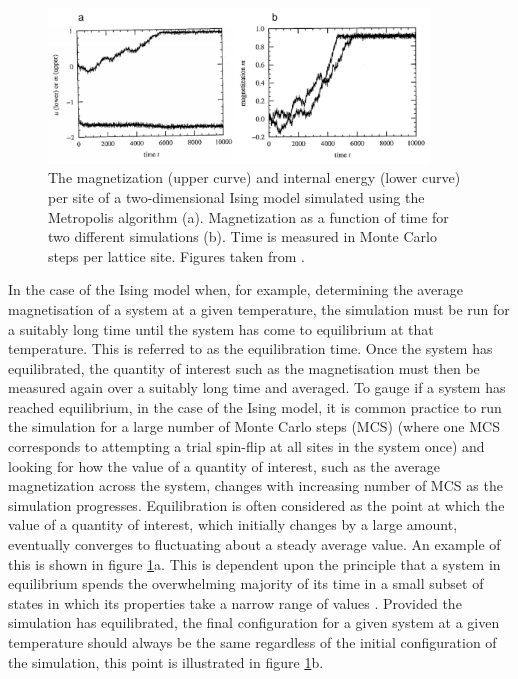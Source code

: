 \documentclass[11pt, twoside]{report}
\begin{document}
\begin{figure}[h!]
  \centering
    \includegraphics[width=0.9\textwidth]{figures/ising_equil.png}
    \caption[The magnetization (upper curve) and internal energy (lower curve) per site of a two-dimensional Ising model simulated using the Metropolis algorithm (a). Magnetization as a function of time for two different simulations (b). Time is measured in Monte Carlo steps per lattice site.]{The magnetization (upper curve) and internal energy (lower curve) per site of a two-dimensional Ising model simulated using the Metropolis algorithm (a). Magnetization as a function of time for two different simulations (b). Time is measured in Monte Carlo steps per lattice site. Figures taken from .}
  \label{ising_equil}
\end{figure}

In the case of the Ising model when, for example, determining the average magnetisation of a system at a given temperature, the simulation must be run for a suitably long time until the system has come to equilibrium at that temperature. This is referred to as the equilibration time. Once the system has equilibrated, the quantity of interest such as the magnetisation must then be measured again over a suitably long time and averaged. 
To gauge if a system has reached equilibrium, in the case of the Ising model, it is common practice to run the simulation for a large number of Monte Carlo steps (MCS) (where one MCS corresponds to attempting a trial spin-flip at all sites in the system once) and looking for how the value of a quantity of interest, such as the average magnetization across the system, changes with increasing number of MCS as the simulation progresses. Equilibration is often considered as the point at which the value of a quantity of interest, which initially changes by a large amount, eventually converges to fluctuating about a steady average value. An example of this is shown in figure \ref{ising_equil}a. This is dependent upon the principle that a system in equilibrium spends the overwhelming majority of its time in a small subset of states in which its properties take a narrow range of values \cite{MC}. Provided the simulation has equilibrated, the final configuration for a given system at a given temperature should always be the same regardless of the initial configuration of the simulation, this point is illustrated in figure \ref{ising_equil}b.
\end{document}
